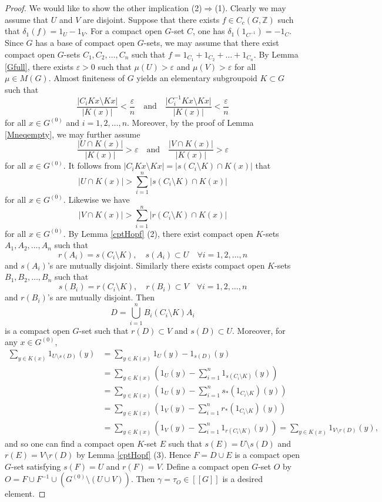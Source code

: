 \documentclass[11pt]{article}
\theoremstyle{definition}
\newcommand{\ep}{\varepsilon}
\newcommand{\Z}{\mathbb{Z}}
\begin{document}
\begin{proof}
We would like to show the other implication (2)$\Rightarrow$(1). 
Clearly we may assume that $U$ and $V$ are disjoint. 
Suppose that there exists $f\in C_c(G,\Z)$ such that $\delta_1(f)=1_U-1_V$. 
For a compact open $G$-set $C$, one has $\delta_1(1_{C^{-1}})=-1_C$. 
Since $G$ has a base of compact open $G$-sets, 
we may assume that 
there exist compact open $G$-sets $C_1,C_2,\dots,C_n$ such that 
$f=1_{C_1}+1_{C_2}+\dots+1_{C_n}$. 
By Lemma \ref{Gfull}, there exists $\ep>0$ such that 
$\mu(U)>\ep$ and $\mu(V)>\ep$ for all $\mu\in M(G)$. 
Almost finiteness of $G$ yields 
an elementary subgroupoid $K\subset G$ such that 
\[
\frac{\lvert C_iKx\setminus Kx\rvert}{\lvert K(x)\rvert}
<\frac{\ep}{n}\quad\text{and}\quad
\frac{\lvert C_i^{-1}Kx\setminus Kx\rvert}{\lvert K(x)\rvert}
<\frac{\ep}{n}
\]
for all $x\in G^{(0)}$ and $i=1,2,\dots,n$. 
Moreover, by the proof of Lemma \ref{Mneqempty}, 
we may further assume 
\[
\frac{\lvert U\cap K(x)\rvert}{\lvert K(x)\rvert}>\ep\quad\text{and}\quad
\frac{\lvert V\cap K(x)\rvert}{\lvert K(x)\rvert}>\ep
\]
for all $x\in G^{(0)}$. 
It follows from $\lvert C_iKx\setminus Kx\rvert
=\lvert s(C_i\setminus K)\cap K(x)\rvert$ that 
\[
\lvert U\cap K(x)\rvert>\sum_{i=1}^n\lvert s(C_i\setminus K)\cap K(x)\rvert
\]
for all $x\in G^{(0)}$. 
Likewise we have 
\[
\lvert V\cap K(x)\rvert>\sum_{i=1}^n\lvert r(C_i\setminus K)\cap K(x)\rvert
\]
for all $x\in G^{(0)}$. 
By Lemma \ref{cptHopf} (2), 
there exist compact open $K$-sets $A_1,A_2,\dots,A_n$ such that 
\[
r(A_i)=s(C_i\setminus K),\quad s(A_i)\subset U\quad\forall i=1,2,\dots,n
\]
and $s(A_i)$'s are mutually disjoint. 
Similarly there exists compact open $K$-sets $B_1,B_2,\dots,B_n$ such that 
\[
s(B_i)=r(C_i\setminus K),\quad r(B_i)\subset V\quad\forall i=1,2,\dots,n
\]
and $r(B_i)$'s are mutually disjoint. 
Then 
\[
D=\bigcup_{i=1}^nB_i(C_i\setminus K)A_i
\]
is a compact open $G$-set such that $r(D)\subset V$ and $s(D)\subset U$. 
Moreover, for any $x\in G^{(0)}$, 
\begin{align*}
\sum_{y\in K(x)}1_{U\setminus s(D)}(y)
&=\sum_{y\in K(x)}1_U(y)-1_{s(D)}(y) \\
&=\sum_{y\in K(x)}\left(1_U(y)-\sum_{i=1}^n1_{s(C_i\setminus K)}(y)\right) \\
&=\sum_{y\in K(x)}
\left(1_U(y)-\sum_{i=1}^ns_*(1_{C_i\setminus K})(y)\right) \\
&=\sum_{y\in K(x)}
\left(1_V(y)-\sum_{i=1}^nr_*(1_{C_i\setminus K})(y)\right) \\
&=\sum_{y\in K(x)}\left(1_V(y)-\sum_{i=1}^n1_{r(C_i\setminus K)}(y)\right)
=\sum_{y\in K(x)}1_{V\setminus r(D)}(y), 
\end{align*}
and so one can find a compact open $K$-set $E$ such that 
$s(E)=U\setminus s(D)$ and $r(E)=V\setminus r(D)$ by Lemma \ref{cptHopf} (3). 
Hence $F=D\cup E$ is a compact open $G$-set 
satisfying $s(F)=U$ and $r(F)=V$. 
Define a compact open $G$-set $O$ 
by $O=F\cup F^{-1}\cup(G^{(0)}\setminus(U\cup V))$. 
Then $\gamma=\tau_O\in[[G]]$ is a desired element. 
\end{proof}
\end{document}
